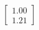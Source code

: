 \documentclass[preview]{standalone}
\begin{document}
\begin{align*}
\begin{bmatrix} 1.00 \\ 1.21 \end{bmatrix}
\end{align*}
\end{document}
